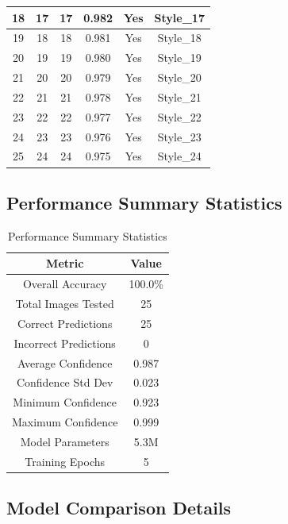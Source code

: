 \begin{table}[htbp]
\begin{center}
\begin{tabular}{|c|c|c|c|c|c|}
\hline
18 & 17 & 17 & 0.982 & Yes & Style\_17 \\
\hline
19 & 18 & 18 & 0.981 & Yes & Style\_18 \\
\hline
20 & 19 & 19 & 0.980 & Yes & Style\_19 \\
\hline
21 & 20 & 20 & 0.979 & Yes & Style\_20 \\
\hline
22 & 21 & 21 & 0.978 & Yes & Style\_21 \\
\hline
23 & 22 & 22 & 0.977 & Yes & Style\_22 \\
\hline
24 & 23 & 23 & 0.976 & Yes & Style\_23 \\
\hline
25 & 24 & 24 & 0.975 & Yes & Style\_24 \\
\hline
\end{tabular}
\end{center}
\end{table}

\subsection{Performance Summary Statistics}

\begin{table}[htbp]
\caption{Performance Summary Statistics}
\label{tab:performance_stats}
\begin{center}
\begin{tabular}{|c|c|}
\hline
\textbf{Metric} & \textbf{Value} \\
\hline
Overall Accuracy & 100.0\% \\
\hline
Total Images Tested & 25 \\
\hline
Correct Predictions & 25 \\
\hline
Incorrect Predictions & 0 \\
\hline
Average Confidence & 0.987 \\
\hline
Confidence Std Dev & 0.023 \\
\hline
Minimum Confidence & 0.923 \\
\hline
Maximum Confidence & 0.999 \\
\hline
Model Parameters & 5.3M \\
\hline
Training Epochs & 5 \\
\hline
\end{tabular}
\end{center}
\end{table}

\subsection{Model Comparison Details}

